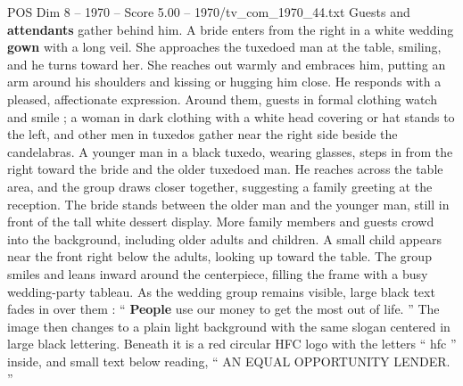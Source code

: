 \begin{textsample}{POS Dim 8 – 1970 – Score 5.00 – 1970/tv\_com\_1970\_44.txt}
Guests and \textbf{attendants} gather behind him.
A bride enters from the right in a white wedding \textbf{gown} with a long veil.
She approaches the tuxedoed man at the table, smiling, and he turns toward her.
She reaches out warmly and embraces him, putting an arm around his shoulders and kissing or hugging him close.
He responds with a pleased, affectionate expression.
Around them, guests in formal clothing watch and smile ; a woman in dark clothing with a white head covering or hat stands to the left, and other men in tuxedos gather near the right side beside the candelabras.
A younger man in a black tuxedo, wearing glasses, steps in from the right toward the bride and the older tuxedoed man.
He reaches across the table area, and the group draws closer together, suggesting a family greeting at the reception.
The bride stands between the older man and the younger man, still in front of the tall white dessert display.
More family members and guests crowd into the background, including older adults and children.
A small child appears near the front right below the adults, looking up toward the table.
The group smiles and leans inward around the centerpiece, filling the frame with a busy wedding-party tableau.
As the wedding group remains visible, large black text fades in over them : “ \textbf{People} use our money to get the most out of life. ” The image then changes to a plain light background with the same slogan centered in large black lettering.
Beneath it is a red circular HFC logo with the letters “ hfc ” inside, and small text below reading, “ AN EQUAL OPPORTUNITY LENDER. ”

\end{textsample}
